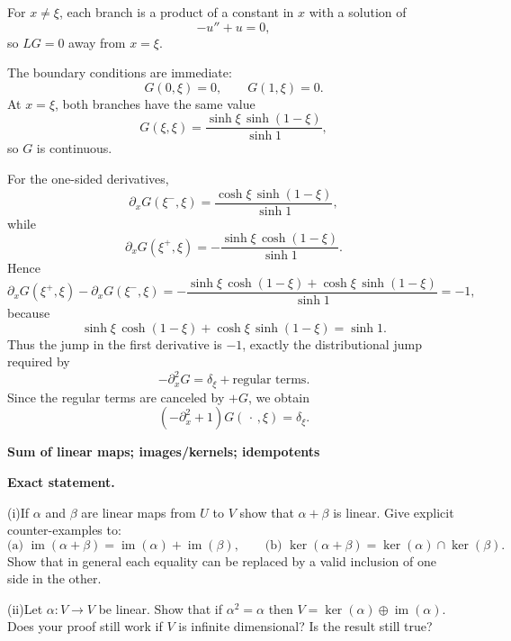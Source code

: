 \begin{solution}
For \(x\neq \xi\), each branch is a product of a constant in \(x\) with a solution of
\[
-u''+u=0,
\]
so \(LG=0\) away from \(x=\xi\).

The boundary conditions are immediate:
\[
G(0,\xi)=0,\qquad G(1,\xi)=0.
\]
At \(x=\xi\), both branches have the same value
\[
G(\xi,\xi)=\frac{\sinh \xi\,\sinh(1-\xi)}{\sinh 1},
\]
so \(G\) is continuous.

For the one-sided derivatives,
\[
\partial_xG(\xi^{-},\xi)
=\frac{\cosh \xi\,\sinh(1-\xi)}{\sinh 1},
\]
while
\[
\partial_xG(\xi^{+},\xi)
=-\frac{\sinh \xi\,\cosh(1-\xi)}{\sinh 1}.
\]
Hence
\[
\partial_xG(\xi^{+},\xi)-\partial_xG(\xi^{-},\xi)
=
-\frac{\sinh \xi\,\cosh(1-\xi)+\cosh \xi\,\sinh(1-\xi)}
{\sinh 1}
=-1,
\]
because
\[
\sinh \xi\,\cosh(1-\xi)+\cosh \xi\,\sinh(1-\xi)=\sinh 1.
\]
Thus the jump in the first derivative is \(-1\), exactly the distributional jump required by
\[
-\partial_x^2G=\delta_\xi+\text{regular terms}.
\]
Since the regular terms are canceled by \(+G\), we obtain
\[
(-\partial_x^2+1)G(\,\cdot\,,\xi)=\delta_\xi.
\]
\end{solution}

\begin{problem}[CP-I-0018]
\label{prob:cp-i-0018}
\textbf{Sum of linear maps; images/kernels; idempotents}

\textbf{Exact statement.}

	\par\hspace*{1.5em} (i)\quad If $\alpha$ and $\beta$ are linear maps from $U$ to $V$ show that $\alpha+\beta$ is linear.
	Give explicit counter-examples to:
	\[
	\text{(a) }\operatorname{im}(\alpha+\beta)=\operatorname{im}(\alpha)+\operatorname{im}(\beta),\qquad
	\text{(b) }\ker(\alpha+\beta)=\ker(\alpha)\cap\ker(\beta).
	\]
	Show that in general each equality can be replaced by a valid inclusion of one side in the other.
	\par\noindent (ii)\quad Let $\alpha:V\to V$ be linear. Show that if $\alpha^2=\alpha$ then
	$V=\ker(\alpha)\oplus \operatorname{im}(\alpha)$.
	Does your proof still work if $V$ is infinite dimensional? Is the result still true?
\end{problem}

